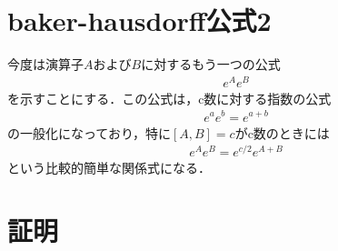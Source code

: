 \documentclass[a4j]{jarticle}
\begin{document}
\section{baker-hausdorff公式2}
今度は演算子$A$および$B$に対するもう一つの公式
\begin{align*}
 e^{A}e^{B}
\end{align*}
を示すことにする．この公式は，c数に対する指数の公式
\begin{align*}
 e^{a}e^{b}=e^{a+b}
\end{align*}
の一般化になっており，特に$[A,B]=c$がc数のときには
\begin{align*}
 e^{A}e^{B}=e^{c/2}e^{A+B}
\end{align*}
という比較的簡単な関係式になる．

\section{証明}
\end{document}

